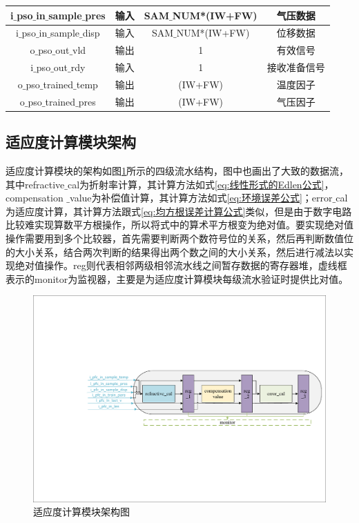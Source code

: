 \begin{table}[htb]
\begin{tabular}{c|c|c|c}
        i$\_$pso$\_$in$\_$sample$\_$pres            & 输入      & SAM$\_$NUM*(IW+FW)    & 气压数据            \\ \hline
        i$\_$pso$\_$in$\_$sample$\_$disp            & 输入      & SAM$\_$NUM*(IW+FW)    & 位移数据            \\ \hline
        o$\_$pso$\_$out$\_$vld                      & 输出      & 1                     & 有效信号            \\ \hline
        i$\_$pso$\_$out$\_$rdy                      & 输入      & 1                     & 接收准备信号          \\ \hline
        o$\_$pso$\_$trained$\_$temp                 & 输出      & (IW+FW)               & 温度因子          \\ \hline
        o$\_$pso$\_$trained$\_$pres                 & 输出      & (IW+FW)               & 气压因子          \\ \hline
    \end{tabular}
  \end{table}

\subsection{适应度计算模块架构}
适应度计算模块的架构如图\ref{fig:适应度计算模块架构图}所示的四级流水结构，图中也画出了大致的数据流，其中refractive$\_$cal为折射率计算，其计算方法如式\eqref{eq:线性形式的Edlen公式}，compensation $\_$value为补偿值计算，其计算方法如式\eqref{eq:环境误差公式}；error$\_$cal为适应度计算，其计算方法跟式\eqref{eq:均方根误差计算公式}类似，但是由于数字电路比较难实现算数平方根操作，所以将式中的算术平方根变为绝对值。要实现绝对值操作需要用到多个比较器，首先需要判断两个数符号位的关系，然后再判断数值位的大小关系，结合两次判断的结果得出两个数之间的大小关系，然后进行减法以实现绝对值操作。reg则代表相邻两级相邻流水线之间暂存数据的寄存器堆，虚线框表示的monitor为监视器，主要是为适应度计算模块每级流水验证时提供比对值。
  \begin{figure}[htb]
    \centering
    \includegraphics[width=14cm]{fig/5-fig/适应度计算模块架构图.pdf}
    \caption{适应度计算模块架构图}
    \label{fig:适应度计算模块架构图}
\end{figure}

